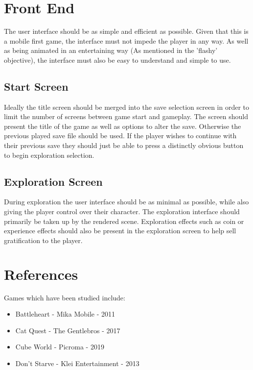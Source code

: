 \documentclass[a4paper]{scrreprt}
\begin{document}


\chapter{Front End}
The user interface should be as simple and efficient as possible.
Given that this is a mobile first game, the interface must not impede the player in any way.
As well as being animated in an entertaining way (As mentioned in the 'flashy' objective), the interface must also be easy to understand and simple to use.

\section{Start Screen}
Ideally the title screen should be merged into the save selection screen in order to limit the number of screens between game start and gameplay.
The screen should present the title of the game as well as options to alter the save.
Otherwise the previous played save file should be used.
If the player wishes to continue with their previous save they should just be able to press a distinctly obvious button to begin exploration selection.

\section{Exploration Screen}
During exploration the user interface should be as minimal as possible, while also giving the player control over their character.
The exploration interface should primarily be taken up by the rendered scene.
Exploration effects such as coin or experience effects should also be present in the exploration screen to help sell gratification to the player.




\chapter{References}
Games which have been studied include:

    \begin{itemize}
        \item Battleheart - Mika Mobile - 2011
        \item Cat Quest - The Gentlebros - 2017
        \item Cube World - Picroma - 2019
        \item Don't Starve - Klei Entertainment - 2013
    \end{itemize}
\end{document}
